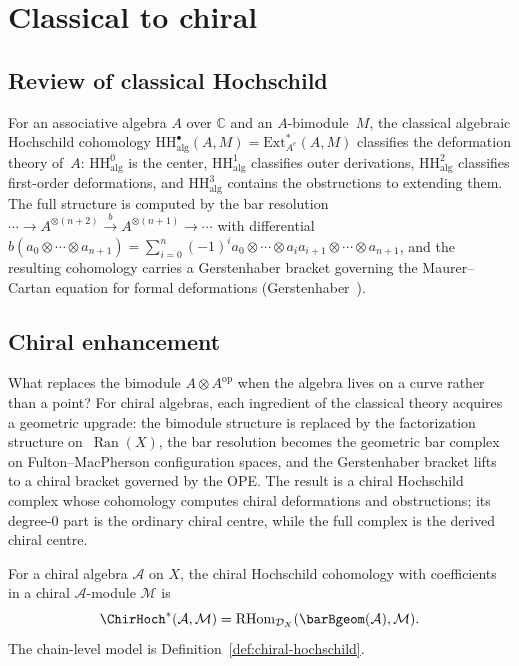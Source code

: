 \section{Classical to chiral}

\subsection{Review of classical Hochschild}

For an associative algebra $A$ over $\mathbb{C}$ and an
$A$-bimodule~$M$, the classical algebraic Hochschild cohomology
$\mathrm{HH}^\bullet_{\mathrm{alg}}(A, M) = \mathrm{Ext}^*_{A^e}(A, M)$
classifies the deformation theory of~$A$:
$\mathrm{HH}^0_{\mathrm{alg}}$ is the center,
$\mathrm{HH}^1_{\mathrm{alg}}$ classifies outer derivations,
$\mathrm{HH}^2_{\mathrm{alg}}$ classifies first-order deformations,
and $\mathrm{HH}^3_{\mathrm{alg}}$ contains the obstructions to
extending them. The full structure is computed by the bar resolution
$\cdots \to A^{\otimes(n+2)} \xrightarrow{b} A^{\otimes(n+1)} \to
\cdots$ with differential $b(a_0 \otimes \cdots \otimes a_{n+1})
= \sum_{i=0}^n (-1)^i a_0 \otimes \cdots \otimes a_ia_{i+1}
\otimes \cdots \otimes a_{n+1}$, and the resulting cohomology
carries a Gerstenhaber bracket governing the Maurer--Cartan equation
for formal deformations \textup{(}Gerstenhaber~\cite{Ger63}\textup{)}.

\subsection{Chiral enhancement}

What replaces the bimodule $A \otimes A^{\mathrm{op}}$ when the algebra lives on a curve rather than a point? For chiral algebras, each ingredient of the classical theory acquires a geometric upgrade: the bimodule structure is replaced by the factorization structure on~$\operatorname{Ran}(X)$, the bar resolution becomes the geometric bar complex on Fulton--MacPherson configuration spaces, and the Gerstenhaber bracket lifts to a chiral bracket governed by the OPE. The result is a chiral Hochschild complex whose cohomology computes chiral deformations and obstructions; its degree-$0$ part is the ordinary chiral centre, while the full complex is the derived chiral centre.

\begin{definition}
\label{def:chiral-hochschild-derived}
For a chiral algebra $\mathcal{A}$ on $X$, the chiral Hochschild
cohomology with coefficients in a chiral $\mathcal{A}$-module
$\mathcal{M}$ is
\[\ChirHoch^*(\mathcal{A}, \mathcal{M})
= \operatorname{RHom}_{\mathcal{D}_X}(\barBgeom(\mathcal{A}), \mathcal{M}).\]
The chain-level model is Definition~\ref{def:chiral-hochschild}.
\end{definition}

